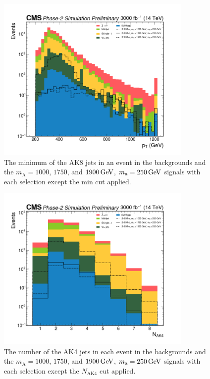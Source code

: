 \begin{figure}[ht]
\centering
\includegraphics[width=0.845\textwidth]{Chapters/Strategy/selections/min_AK8_pt.png}
\caption{The minimum \pt of the AK8 jets in an event in the backgrounds and the $m_\mathrm{A} =1000$, $1750$, and $\GeV{1900}$, $m_\mathrm{a} = \GeV{250}$ signals with each selection except the min \pt cut applied.}
\label{fig:minak8pt}
\end{figure}

\begin{figure}[ht]
\centering
\includegraphics[width=0.845\textwidth]{Chapters/Strategy/selections/n_AK4.png}
\caption{The number of the AK4 jets in each event in the backgrounds and the $m_\mathrm{A} =1000$, $1750$, and $\GeV{1900}$, $m_\mathrm{a} = \GeV{250}$ signals with each selection except the $N_\text{AK4}$ cut applied.}
\label{fig:nak4}
\end{figure}

